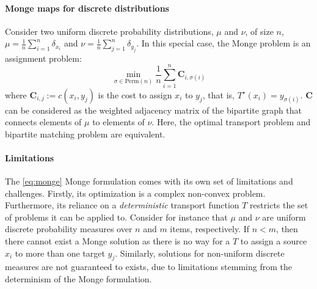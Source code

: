 \paragraph{Monge maps for discrete distributions}
Consider two uniform discrete probability distributions, $\mu$ and $\nu$, of size $n$,
$\mu = \frac{1}{n} \sum_{i=1}^n \delta_{x_i}$
and $\nu = \frac{1}{n} \sum_{j=1}^n \delta_{y_j}$.
In this special case, the Monge problem is an assignment problem: %
\begin{equation}
  \min_{\sigma \in \text{Perm}(n)} \frac{1}{n} \sum_{i=1}^{n} \mathbf{C}_{i,\sigma(i)}
\end{equation}
where $\mathbf{C}_{i,j} := c(x_i, y_j)$ is the cost to assign $x_i$ to $y_j$,
that is, $T^\star(x_i) = y_{\sigma(i)}$.
$\mathbf{C}$ can be considered as the weighted adjacency matrix of the bipartite graph that connects elements of $\mu$ to elements of $\nu$.
Here, the optimal transport problem and bipartite matching problem are equivalent.

\paragraph{Limitations}
The \ref{eq:monge} Monge formulation comes with its own set of limitations and challenges.
Firstly, its optimization is a complex non-convex problem.
Furthermore, its reliance on a \emph{deterministic} transport function $T$ restricts the set of problems it can be applied to.
Consider for instance that $\mu$ and $\nu$ are uniform discrete probability measures over $n$ and $m$ items, respectively.
If $n < m$, then there cannot exist a Monge solution as there is no way for a $T$ to assign a source $x_i$ to more than one target $y_j$.
Similarly, solutions for non-uniform discrete measures are not guaranteed to exists,
due to limitations stemming from the determinism of the Monge formulation.

